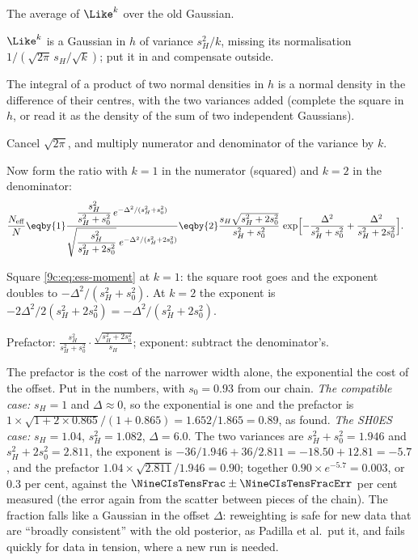 \begin{explain}
  \item The average of $\Like^k$ over the old Gaussian.
  \item $\Like^k$ is a Gaussian in $h$ of variance $s_H^2/k$, missing its normalisation $1/(\sqrt{2\pi}\,s_H/\sqrt k)$;
        put it in and compensate outside.
  \item The integral of a product of two normal densities in $h$ is a normal density in the difference of their
        centres, with the two variances added (complete the square in $h$, or read it as the density of the sum
        of two independent Gaussians).
  \item Cancel $\sqrt{2\pi}$, and multiply numerator and denominator of the variance by $k$.
\end{explain}
Now form the ratio with $k=1$ in the numerator (squared) and $k=2$ in the denominator:
\begin{align}
  \frac{N_{\rm eff}}{N}
  &\eqby{1}\frac{\dfrac{s_H^2}{s_H^2+s_0^2}\,e^{-\Delta^2/(s_H^2+s_0^2)}}
               {\sqrt{\dfrac{s_H^2}{s_H^2+2s_0^2}}\;e^{-\Delta^2/(s_H^2+2s_0^2)}}
   \eqby{2}\frac{s_H\sqrt{s_H^2+2s_0^2}}{s_H^2+s_0^2}\,
  \exp\Bigl[-\frac{\Delta^2}{s_H^2+s_0^2}+\frac{\Delta^2}{s_H^2+2s_0^2}\Bigr].
  \label{9c:eq:ess-gauss}
\end{align}
\begin{explain}
  \item Square \eqref{9c:eq:ess-moment} at $k=1$: the square root goes and the exponent doubles to
        $-\Delta^2/(s_H^2+s_0^2)$. At $k=2$ the exponent is $-2\Delta^2/2(s_H^2+2s_0^2)=-\Delta^2/(s_H^2+2s_0^2)$.
  \item Prefactor: $\frac{s_H^2}{s_H^2+s_0^2}\cdot\frac{\sqrt{s_H^2+2s_0^2}}{s_H}$; exponent: subtract the denominator's.
\end{explain}
The prefactor is the cost of the narrower width alone, the exponential the cost of the offset. Put in the numbers,
with $s_0=0.93$ from our chain. \emph{The compatible case:} $s_H=1$ and $\Delta\approx0$, so the exponential is one and
the prefactor is $1\times\sqrt{1+2\times0.865}/(1+0.865)=1.652/1.865=0.89$, as found. \emph{The SH0ES case:} $s_H=1.04$,
$s_H^2=1.082$, $\Delta=6.0$. The two variances are $s_H^2+s_0^2=1.946$ and $s_H^2+2s_0^2=2.811$, the exponent is
$-36/1.946+36/2.811=-18.50+12.81=-5.7$, and the prefactor $1.04\times\sqrt{2.811}/1.946=0.90$; together
$0.90\times e^{-5.7}=0.003$, or $0.3$ per cent, against the $\NineCIsTensFrac\pm\NineCIsTensFracErr$ per cent
measured (the error again from the scatter between pieces of the chain). The fraction falls like a Gaussian in the offset $\Delta$: reweighting is safe for
new data that are ``broadly consistent'' with the old posterior, as Padilla et al.\ put it, and fails quickly for data
in tension, where a new run is needed.

